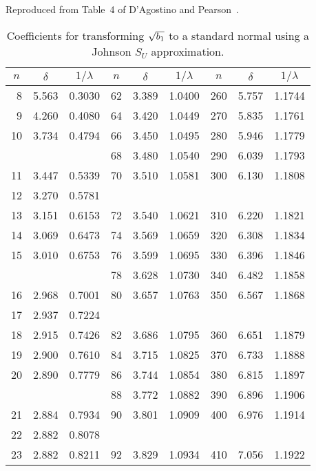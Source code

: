 \documentclass[draft]{article}
\begin{document}
\begin{table}
\caption{
Coefficients for transforming \(\protect\sqrt{b_1}\) to a standard normal
using a Johnson \(S_U\) approximation.}
\centerline{Reproduced from Table~4 of D'Agostino and
Pearson~\protect\cite{dagostino73}.}
\label{tbl:johnson}
\scriptsize
\begin{center}
\begin{tabular}{rllrllrll}\hline
\multicolumn{1}{c}{\(n\)} & \multicolumn{1}{c}{\(\delta\)}
& \multicolumn{1}{c}{\(1/\lambda\)} &
\multicolumn{1}{c}{\(n\)} & \multicolumn{1}{c}{\(\delta\)}
& \multicolumn{1}{c}{\(1/\lambda\)} &
\multicolumn{1}{c}{\(n\)} & \multicolumn{1}{c}{\(\delta\)}
& \multicolumn{1}{c}{\(1/\lambda\)} \\ \hline
 8 & 5.563 & 0.3030 & 62 & 3.389 & 1.0400 & 260 & 5.757 & 1.1744 \\
 9 & 4.260 & 0.4080 & 64 & 3.420 & 1.0449 & 270 & 5.835 & 1.1761 \\
10 & 3.734 & 0.4794 & 66 & 3.450 & 1.0495 & 280 & 5.946 & 1.1779 \\
   &       &        & 68 & 3.480 & 1.0540 & 290 & 6.039 & 1.1793 \\
11 & 3.447 & 0.5339 & 70 & 3.510 & 1.0581 & 300 & 6.130 & 1.1808 \\
12 & 3.270 & 0.5781 \\
13 & 3.151 & 0.6153 & 72 & 3.540 & 1.0621 & 310 & 6.220 & 1.1821 \\
14 & 3.069 & 0.6473 & 74 & 3.569 & 1.0659 & 320 & 6.308 & 1.1834 \\
15 & 3.010 & 0.6753 & 76 & 3.599 & 1.0695 & 330 & 6.396 & 1.1846 \\
   &       &        & 78 & 3.628 & 1.0730 & 340 & 6.482 & 1.1858 \\
16 & 2.968 & 0.7001 & 80 & 3.657 & 1.0763 & 350 & 6.567 & 1.1868 \\
17 & 2.937 & 0.7224 \\
18 & 2.915 & 0.7426 & 82 & 3.686 & 1.0795 & 360 & 6.651 & 1.1879 \\
19 & 2.900 & 0.7610 & 84 & 3.715 & 1.0825 & 370 & 6.733 & 1.1888 \\
20 & 2.890 & 0.7779 & 86 & 3.744 & 1.0854 & 380 & 6.815 & 1.1897 \\
   &       &        & 88 & 3.772 & 1.0882 & 390 & 6.896 & 1.1906 \\
21 & 2.884 & 0.7934 & 90 & 3.801 & 1.0909 & 400 & 6.976 & 1.1914 \\
22 & 2.882 & 0.8078 \\
23 & 2.882 & 0.8211 & 92 & 3.829 & 1.0934 & 410 & 7.056 & 1.1922 \\

\end{tabular}
\end{center}
\end{table}
\end{document}
